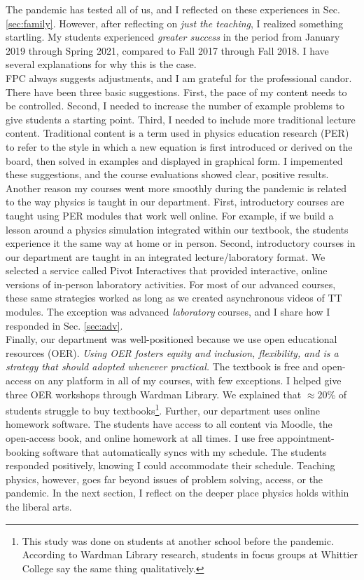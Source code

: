\documentclass[../../../main.tex]{subfiles}
\begin{document}
The pandemic has tested all of us, and I reflected on these experiences in Sec. \ref{sec:family}.  However, after reflecting on \textit{just the teaching}, I realized something startling.  My students experienced \textit{greater success} in the period from January 2019 through Spring 2021, compared to Fall 2017 through Fall 2018.  I have several explanations for why this is the case.
\\
\vspace{0.15cm}
FPC always suggests adjustments, and I am grateful for the professional candor.  There have been three basic suggestions.  First, the pace of my content needs to be controlled.  Second, I needed to increase the number of example problems to give students a starting point.  Third, I needed to include more traditional lecture content.  Traditional content is a term used in physics education research (PER) to refer to the style in which a new equation is first introduced or derived on the board, then solved in examples and displayed in graphical form.  I impemented these suggestions, and the course evaluations showed clear, positive results.
\\
\vspace{0.15cm}
Another reason my courses went more smoothly during the pandemic is related to the way physics is taught in our department.  First, introductory courses are taught using PER modules that work well online.  For example, if we build a lesson around a physics simulation integrated within our textbook, the students experience it the same way at home or in person.  Second, introductory courses in our department are taught in an integrated lecture/laboratory format.  We selected a service called Pivot Interactives that provided interactive, online versions of in-person laboratory activities.  For most of our advanced courses, these same strategies worked as long as we created asynchronous videos of TT modules.  The exception was advanced \textit{laboratory} courses, and I share how I responded in Sec. \ref{sec:adv}.
\\
\vspace{0.15cm}
Finally, our department was well-positioned because we use open educational resources (OER).  \textit{Using OER fosters equity and inclusion, flexibility, and is a strategy that should adopted whenever practical.}  The textbook is free and open-access on any platform in all of my courses, with few exceptions.  I helped give three OER workshops through Wardman Library.  We explained that $\approx 20$\% of students struggle to buy textbooks\footnote{This study was done on students at another school before the pandemic.  According to Wardman Library research, students in focus groups at Whittier College say the same thing qualitatively.}.  Further, our department uses online homework software.  The students have access to all content via Moodle, the open-access book, and online homework at all times.  I use free appointment-booking software that automatically syncs with my schedule.  The students responded positively, knowing I could accommodate their schedule.  Teaching physics, however, goes far beyond issues of problem solving, access, or the pandemic.  In the next section, I reflect on the deeper place physics holds within the liberal arts.
\end{document}
